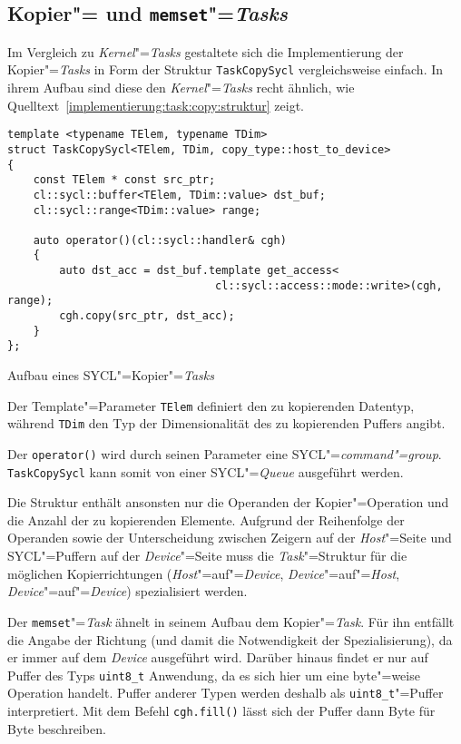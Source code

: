 \subsection{Kopier"= und \texttt{memset}"=\textit{Tasks}}

Im Vergleich zu \textit{Kernel}"=\textit{Tasks} gestaltete sich die
Implementierung der Kopier"=\textit{Tasks} in Form der Struktur
\texttt{TaskCopySycl} vergleichsweise einfach. In ihrem Aufbau sind diese den
\textit{Kernel}"=\textit{Tasks} recht ähnlich, wie
Quelltext~\ref{implementierung:task:copy:struktur} zeigt.

\begin{code}
    \begin{verbatim}
template <typename TElem, typename TDim>
struct TaskCopySycl<TElem, TDim, copy_type::host_to_device>
{
    const TElem * const src_ptr;
    cl::sycl::buffer<TElem, TDim::value> dst_buf;
    cl::sycl::range<TDim::value> range;

    auto operator()(cl::sycl::handler& cgh)
    {
        auto dst_acc = dst_buf.template get_access<
                                cl::sycl::access::mode::write>(cgh, range);
        cgh.copy(src_ptr, dst_acc);
    }
};
    \end{verbatim}
    \caption{Aufbau eines SYCL"=Kopier"=\textit{Tasks}}
    \label{implementierung:task:copy:struktur}
\end{code}
\vspace{3mm}
Der Template"=Parameter \texttt{TElem} definiert den zu kopierenden Datentyp,
während \texttt{TDim} den Typ der Dimensionalität des zu kopierenden Puffers
angibt.  

Der \texttt{operator()} wird durch seinen Parameter eine
SYCL"=\textit{command"=group}. \texttt{TaskCopySycl} kann somit von einer
SYCL"=\textit{Queue} ausgeführt werden.

Die Struktur enthält ansonsten nur die Operanden der Kopier"=Operation und die
Anzahl der zu kopierenden Elemente. Aufgrund der Reihenfolge der Operanden sowie
der Unterscheidung zwischen Zeigern auf der \textit{Host}"=Seite und
SYCL"=Puffern auf der \textit{Device}"=Seite muss die \textit{Task}"=Struktur
für die möglichen Kopierrichtungen (\textit{Host}"=auf"=\textit{Device},
\textit{Device}"=auf"=\textit{Host}, \textit{Device}"=auf"=\textit{Device})
spezialisiert werden.

Der \texttt{memset}"=\textit{Task} ähnelt in seinem Aufbau dem
Kopier"=\textit{Task}. Für ihn entfällt die Angabe der Richtung (und damit die
Notwendigkeit der Spezialisierung), da er immer auf dem \textit{Device}
ausgeführt wird. Darüber hinaus findet er nur auf Puffer des Typs
\texttt{uint8\_t} Anwendung, da es sich hier um eine byte"=weise Operation
handelt. Puffer anderer Typen werden deshalb als \texttt{uint8\_t}"=Puffer
interpretiert. Mit dem Befehl \texttt{cgh.fill()} lässt sich der Puffer dann
Byte für Byte beschreiben.

